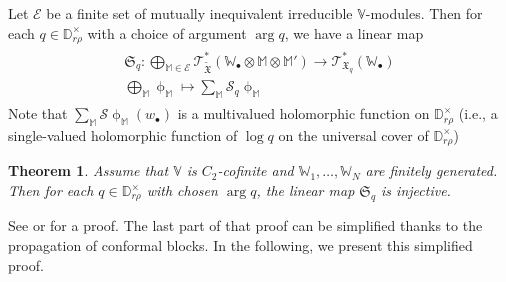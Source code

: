 \documentclass[11pt,b5paper,notitlepage]{article}
\theoremstyle{definition}
\theoremstyle{plain}
\newtheorem{thm}[df]{Theorem}
\newcommand{\fk}{\mathfrak}
\newcommand{\mc}{\mathcal}
\newcommand{\wtd}{\widetilde}
\newcommand{\scr}{\mathscr}
\newcommand{\blt}{\bullet}
\newcommand{\Vbb}{\mathbb V}
\newcommand{\Wbb}{\mathbb W}
\newcommand{\Mbb}{\mathbb M}
\newcommand{\Dbb}{\mathbb D}
\numberwithin{equation}{section}
\begin{document}
Let $\mc E$ be a finite set of mutually inequivalent irreducible $\Vbb$-modules. Then for each $q\in\Dbb_{r\rho}^\times$ with a choice of argument $\arg q$, we have a linear map
\begin{gather}\label{eq254}
\begin{gathered}
\fk S_q:\bigoplus_{\Mbb\in\mc E}\scr T_{\wtd{\fk X}}^*(\Wbb_\blt\otimes\Mbb\otimes\Mbb')\rightarrow\scr T_{\fk X_q}^*(\Wbb_\blt)\\
\bigoplus_\Mbb\upphi_\Mbb\mapsto \sum_\Mbb\mc S_q\upphi_\Mbb
\end{gathered}
\end{gather} 
Note that $\sum_\Mbb\mc S\upphi_\Mbb(w_\blt)$ is a multivalued holomorphic function on $\Dbb_{r\rho}^\times$ (i.e.,  a single-valued holomorphic function of $\log q$ on the universal cover of $\Dbb_{r\rho}^\times$)

\begin{thm}\label{lb172}
Assume that $\Vbb$ is $C_2$-cofinite and $\Wbb_1,\dots,\Wbb_N$ are finitely generated. Then for each $q\in\Dbb_{r\rho}^\times$ with chosen $\arg q$, the linear map $\fk S_q$ is injective.
\end{thm}

See \cite[Sec. 4.4]{Gui} or \cite[Sec. 12]{Gui20} for a proof. The last part of that proof can be simplified thanks to the propagation of conformal blocks. In the following, we present this simplified proof.
\end{document}
